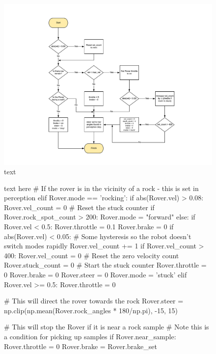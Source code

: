 \documentclass[a4paper]{article}
\begin{document}
\begin{figure}[h]
\hspace{-0.5cm}
\includegraphics[scale = 0.6]{forward_flow}
\caption{text}
\end{figure}

\begin{figure}[h]\scriptsize
\begin{sexylisting}{text here}
# If the rover is in the vicinity of a rock - this is set in perception 
        elif Rover.mode == 'rocking':
            if abs(Rover.vel) > 0.08:
                Rover.vel_count = 0 # Reset the stuck counter
            if Rover.rock_spot_count > 200:
                Rover.mode = "forward"
            else:
                if Rover.vel < 0.5:
                    Rover.throttle = 0.1
                    Rover.brake = 0
                    if abs(Rover.vel) < 0.05:
                        # Some hysteresis so the robot doesn't switch modes rapidly
                        Rover.vel_count += 1
                        if Rover.vel_count > 400:
                            Rover.vel_count = 0 # Reset the zero velocity count
                            Rover.stuck_count = 0 # Start the stuck counter
                            Rover.throttle = 0
                            Rover.brake = 0
                            Rover.steer = 0
                            Rover.mode = 'stuck'
                elif Rover.vel >= 0.5:
                    Rover.throttle = 0
                
                # This will direct the rover towards the rock
                Rover.steer = np.clip(np.mean(Rover.rock_angles * 180/np.pi), -15, 15)
                
                # This will stop the Rover if it is near a rock sample
                # Note this is a condition for picking up samples
                if Rover.near_sample:
                    Rover.throttle = 0
                    Rover.brake = Rover.brake_set
\end{sexylisting}
\end{figure}
\end{document}
